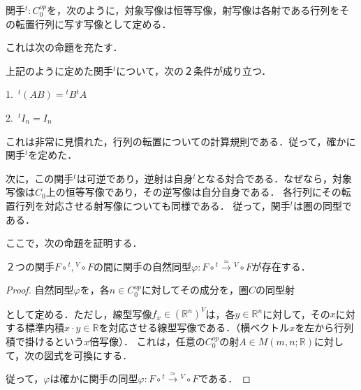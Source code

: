 \documentclass[uplatex, 12pt, dvipdfmx]{jsreport}
\begin{document}
関手${}^t:C^{op}_0$を，次のように，対象写像は恒等写像，射写像は各射である行列をその転置行列に写す写像として定める．
\begin{center}\end{center}
これは次の命題を充たす．
\begin{proposition}
    上記のように定めた関手${}^t$について，次の２条件が成り立つ．\rm{}

    1.\, ${}^t\! (AB) = {}^t\! B{}^t\! A$

    2.\, ${}^t\! I_n = I_n$
\end{proposition}
これは非常に見慣れた，行列の転置についての計算規則である．従って，確かに関手${}^t$を定めた．

次に，この関手${}^t$は可逆であり，逆射は自身${}^t$となる対合である．なぜなら，対象写像は$C_0$上の恒等写像であり，その逆写像は自分自身である．
各行列にその転置行列を対応させる射写像についても同様である．
従って，関手${}^t$は圏の同型である．

ここで，次の命題を証明する．
\begin{proposition}
    ２つの関手$F\circ {}^t, {}^V\circ F$の間に関手の自然同型$\varphi :F\circ {}^t\xrightarrow{\simeq} {}^V\circ F$が存在する．
\end{proposition}
\begin{proof}
    自然同型$\varphi$を，各$n\in C_0^{op}$に対してその成分を，圏$C$の同型射
    \begin{center}\end{center}
    として定める．ただし，線型写像$f_x\in(\mathbb{R}^n)^V$は，各$y\in\mathbb{R}^n$に対して，その$x$に対する標準内積$x\cdot y\in\mathbb{R}$を対応させる線型写像である．（横ベクトル$x$を左から行列積で掛けるという$x$倍写像）．
    これは，任意の$C_0^{op}$の射$A\in M(m,n;\mathbb{R})$に対して，次の図式を可換にする．
    \begin{center}\end{center}
    従って，$\varphi$は確かに関手の同型$\varphi :F\circ {}^t\xrightarrow{\simeq} {}^V\circ F$である．
\end{proof}
\end{document}
